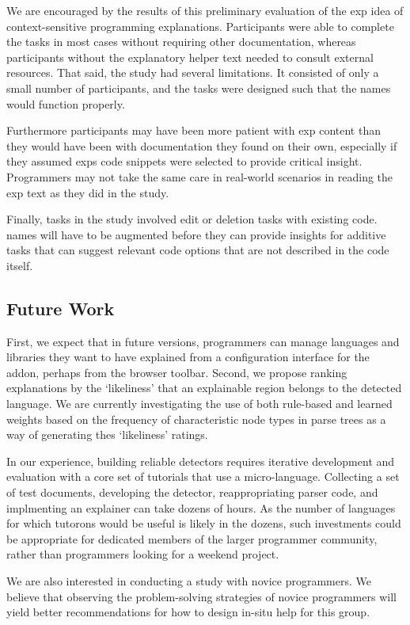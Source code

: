 We are encouraged by the results of this preliminary evaluation of the \gls{exp} idea of context-sensitive programming explanations.
Participants were able to complete the tasks in most cases without requiring other documentation, whereas participants without the explanatory helper text needed to consult external resources.
That said, the study had several limitations.  It consisted of only a small number of participants, and the tasks were designed such that the \glspl{name} would function properly. 

Furthermore participants may have been more patient with \gls{exp} content than they would have been with documentation they found on their own, especially if they assumed \glspl{exp} code snippets were selected to provide critical insight.
Programmers may not take the same care in real-world scenarios in reading the \gls{exp} text as they did in the study.

Finally, tasks in the study involved edit or deletion tasks with existing code.
\Glspl{name} will have to be augmented before they can provide insights for additive tasks that can suggest relevant code options that are not described in the code itself.

\subsection{Future Work}

\begin{changes}
First, we expect that in future versions, programmers can manage languages and libraries they want to have explained from a configuration interface for the addon, perhaps from the browser toolbar.
Second, we propose ranking explanations by the `likeliness' that an explainable region belongs to the detected language.
We are currently investigating the use of both rule-based and learned weights based on the frequency of characteristic node types in parse trees as a way of generating thes `likeliness' ratings.
\end{changes}

\begin{changes}
In our experience, building reliable detectors requires iterative development and evaluation with a core set of tutorials that use a micro-language.
Collecting a set of test documents, developing the detector, reappropriating parser code, and implmenting an explainer can take dozens of hours.
As the number of languages for which tutorons would be useful is likely in the dozens, such investments could be appropriate for dedicated members of the larger programmer community, rather than programmers looking for a weekend project.
\end{changes}

We are also interested in conducting a study with novice programmers.
We believe that observing the problem-solving strategies of novice programmers will yield better recommendations for how to design in-situ help for this group.
